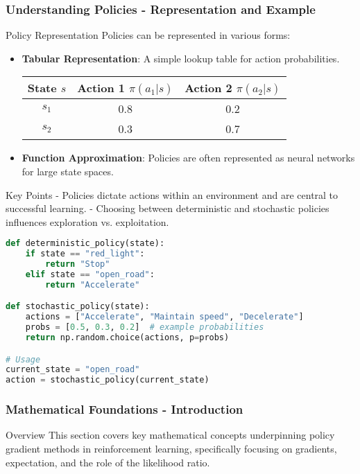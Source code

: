 \documentclass[aspectratio=169]{beamer}
\begin{document}
\begin{frame}[fragile]
    \frametitle{Understanding Policies - Representation and Example}
    \begin{block}{Policy Representation}
        Policies can be represented in various forms:
        \begin{itemize}
            \item \textbf{Tabular Representation}: A simple lookup table for action probabilities.
            \begin{center}
            \begin{tabular}{|c|c|c|}
                \hline
                State \( s \) & Action 1 \( \pi(a_1|s) \) & Action 2 \( \pi(a_2|s) \) \\
                \hline
                \( s_1 \) & 0.8 & 0.2 \\
                \( s_2 \) & 0.3 & 0.7 \\
                \hline
            \end{tabular}
            \end{center}
            \item \textbf{Function Approximation}: Policies are often represented as neural networks for large state spaces.
        \end{itemize}
    \end{block}

    \begin{block}{Key Points}
        - Policies dictate actions within an environment and are central to successful learning.
        - Choosing between deterministic and stochastic policies influences exploration vs. exploitation.
    \end{block}
    
    \begin{lstlisting}[language=Python]
def deterministic_policy(state):
    if state == "red_light":
        return "Stop"
    elif state == "open_road":
        return "Accelerate"

def stochastic_policy(state):
    actions = ["Accelerate", "Maintain speed", "Decelerate"]
    probs = [0.5, 0.3, 0.2]  # example probabilities
    return np.random.choice(actions, p=probs)

# Usage
current_state = "open_road"
action = stochastic_policy(current_state)
    \end{lstlisting}
\end{frame}

\begin{frame}[fragile]
    \frametitle{Mathematical Foundations - Introduction}
    \begin{block}{Overview}
        This section covers key mathematical concepts underpinning policy gradient methods in reinforcement learning, specifically focusing on gradients, expectation, and the role of the likelihood ratio.
    \end{block}
\end{frame}
\end{document}
